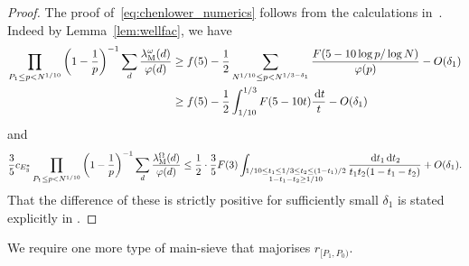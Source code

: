 \documentclass[12pt]{amsart}
\theoremstyle{definition}
\theoremstyle{remark}
\numberwithin{equation}{section}
\newcommand{\1}{\mathbf{1}}
\renewcommand\d{\,\mathrm{d}}
\begin{document}
\begin{proof}
    The proof of~\eqref{eq:chenlower_numerics} follows from the calculations in~\cite[Appendices A.3, A.4, A.5]{matomaki-shao}. Indeed by Lemma~\ref{lem:wellfac}, we have
    \begin{align*}
        \prod_{P_1\leq p < N^{1/10}}\left(1-\frac{1}{p}\right)^{-1}\sum_{d}\frac{\lambda^\omega_{\textup{M}}(d)}{\varphi(d)}&\geq f(5)-\frac{1}{2}\sum_{N^{1/10}\leq p <N^{1/3-\delta_1}}\frac{F(5-10 \log p/\log N)}{\varphi(p)} -O(\delta_1)\\
        &\geq f(5)-\frac{1}{2}\int_{1/10}^{1/3} F(5-10 t) \frac{\d t}{t}-O(\delta_1)
    \end{align*}
    and
    \begin{align*}
             \frac{3}{5}c_{E_3^*}\prod_{P_1\leq p < N^{1/10}}\left(1-\frac{1}{p}\right)^{-1}\sum_{d}\frac{\lambda^\Omega_{\textup{M}}(d)}{\varphi(d)}\leq \frac{1}{2}\cdot \frac{3}{5}F(3) \int_{\substack{1/10\leq t_1\leq 1/3\leq t_2\leq (1-t_1)/2\\ 1-t_1-t_2\geq 1/10}}\frac{\d t_1 \d t_2}{t_1t_2(1-t_1-t_2)}+O(\delta_1).
        \end{align*}
        That the difference of these is strictly positive for sufficiently small $\delta_1$ is stated explicitly in \cite[Appendix A.5]{matomaki-shao}.
\end{proof}

We require one more type of main-sieve that majorises $r_{[P_1,P_0)}$. 
\end{document}
